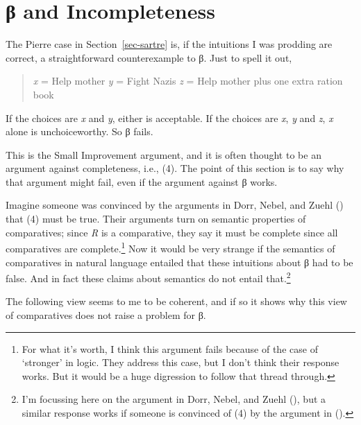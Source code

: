 \documentclass[
  11pt,
  letterpaper,
  DIV=11,
  numbers=noendperiod,
  twoside]{scrartcl}
\begin{document}
\section{β and Incompleteness}\label{sec-dorr}

The Pierre case in Section~\ref{sec-sartre} is, if the intuitions I was
prodding are correct, a straightforward counterexample to β. Just to
spell it out,

\begin{quote}
\emph{x} = Help mother \emph{y} = Fight Nazis \emph{z} = Help mother
plus one extra ration book
\end{quote}

If the choices are \emph{x} and \emph{y}, either is acceptable. If the
choices are \emph{x}, \emph{y} and \emph{z}, \emph{x} alone is
unchoiceworthy. So β fails.

This is the Small Improvement argument, and it is often thought to be an
argument against completeness, i.e., (4). The point of this section is
to say why that argument might fail, even if the argument against β
works.

Imagine someone was convinced by the arguments in Dorr, Nebel, and Zuehl
() that (4) must be true. Their
arguments turn on semantic properties of comparatives; since \emph{R} is
a comparative, they say it must be complete since all comparatives are
complete.\footnote{For what it's worth, I think this argument fails
  because of the case of `stronger' in logic. They address this case,
  but I don't think their response works. But it would be a huge
  digression to follow that thread through.} Now it would be very
strange if the semantics of comparatives in natural language entailed
that these intuitions about β had to be false. And in fact these claims
about semantics do not entail that.\footnote{I'm focussing here on the
  argument in Dorr, Nebel, and Zuehl
  (), but a similar response works if
  someone is convinced of (4) by the argument in
  ().}

The following view seems to me to be coherent, and if so it shows why
this view of comparatives does not raise a problem for β.
\end{document}
